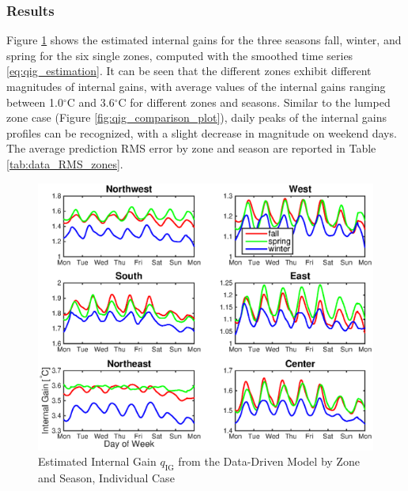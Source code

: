 \subsubsection{Results}
Figure \ref{fig:qig_seasons_indiv} shows the estimated internal gains for the three seasons fall, winter, and spring for the six single zones, computed with the smoothed time series \eqref{eq:qig_estimation}. It can be seen that the different zones exhibit different magnitudes of internal gains, with average values of the internal gains ranging between 1.0$^{\circ}$C and 3.6$^{\circ}$C for different zones and seasons. Similar to the lumped zone case (Figure \ref{fig:qig_comparison_plot}), daily peaks of the internal gains profiles can be recognized, with a slight decrease in magnitude on weekend days. The average prediction RMS error by zone and season are reported in Table \ref{tab:data_RMS_zones}.	

\begin{figure}[hbtp]
\centering
\includegraphics[width=\textwidth]{chapters/building_model/figures/data_indiv_qig.eps}
\vspace*{-0.5cm}
\caption{Estimated Internal Gain $q_{\text{IG}}$ from the Data-Driven Model by Zone and Season, Individual Case}
\label{fig:qig_seasons_indiv}
\end{figure}

